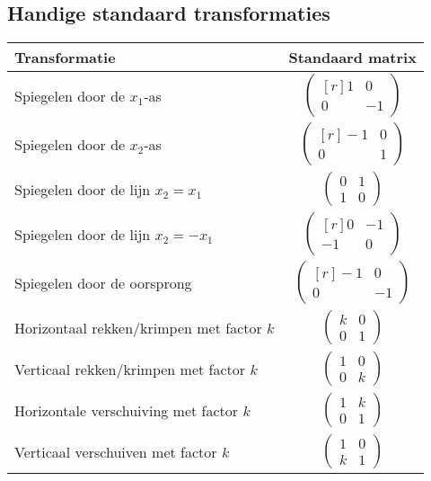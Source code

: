\subsection{Handige standaard transformaties}
\begin{table}[h]
	\centering
	\begin{tabular}{l|c}
		\textbf{Transformatie} & \textbf{Standaard matrix} \\ \hline
		Spiegelen door de $x_1$-as & $\begin{pmatrix*}[r] 1 & 0 \\ 0 & -1 \end{pmatrix*}$ \\ \hline
		Spiegelen door de $x_2$-as & $\begin{pmatrix*}[r] -1 & 0 \\ 0 & 1 \end{pmatrix*}$ \\ \hline
		Spiegelen door de lijn $x_2 = x_1$ & $\begin{pmatrix} 0 & 1 \\ 1 & 0 \end{pmatrix}$ \\ \hline
		Spiegelen door de lijn $x_2 = -x_1$ & $\begin{pmatrix*}[r] 0 & -1 \\ -1 & 0 \end{pmatrix*}$ \\ \hline
		Spiegelen door de oorsprong & $\begin{pmatrix*}[r] -1 & 0 \\ 0 & -1 \end{pmatrix*}$ \\ \hline
		Horizontaal rekken/krimpen met factor $k$ & $\begin{pmatrix} k & 0 \\ 0 & 1 \end{pmatrix}$ \\ \hline
		Verticaal rekken/krimpen met factor $k$ & $\begin{pmatrix} 1 & 0 \\ 0 & k \end{pmatrix}$ \\ \hline
		Horizontale verschuiving met factor $k$ & $\begin{pmatrix} 1 & k \\ 0 & 1 \end{pmatrix}$ \\ \hline
		Verticaal verschuiven met factor $k$ & $\begin{pmatrix} 1 & 0 \\ k & 1 \end{pmatrix}$ \\ \hline

\end{tabular}
\end{table}

